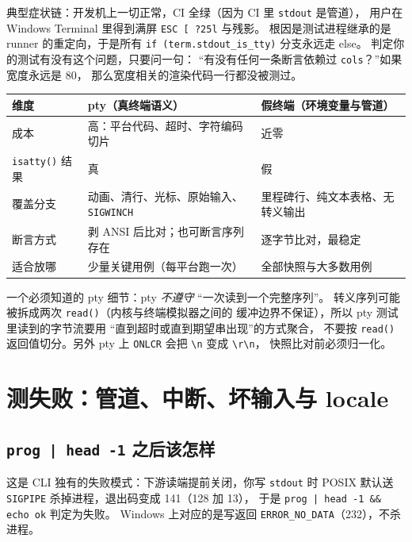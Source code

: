 \documentclass[12pt,a4paper,fontset=fandol]{ctexbook}
\newcommand{\Fn}[1]{\texttt{#1()}}
\newcommand{\Tp}[1]{\texttt{#1}}
\begin{document}
\begin{warning}[title={只覆盖管道路径是最贵的漏测}]
典型症状链：开发机上一切正常，CI 全绿（因为 CI 里 \Tp{stdout} 是管道），
用户在 Windows Terminal 里得到满屏 \Tp{ESC [ ?25l} 与残影。
根因是测试进程继承的是 runner 的重定向，于是所有
\lstinline|if (term.stdout_is_tty)| 分支永远走 else。
判定你的测试有没有这个问题，只要问一句：
``有没有任何一条断言依赖过 \Tp{cols}？''如果宽度永远是 80，
那么宽度相关的渲染代码一行都没被测过。
\end{warning}

\begin{compare}[title={pty 与假终端各自能测什么}]
\begin{tabular}{@{}>{\raggedright\arraybackslash}p{}
               >{\raggedright\arraybackslash}p{}
               >{\raggedright\arraybackslash}p{}@{}}
\toprule
维度 & pty（真终端语义） & 假终端（环境变量与管道） \\
\midrule
成本 & 高：平台代码、超时、字符编码切片 & 近零 \\
\Fn{isatty} 结果 & 真 & 假 \\
覆盖分支 & 动画、清行、光标、原始输入、\Tp{SIGWINCH} &
里程碑行、纯文本表格、无转义输出 \\
断言方式 & 剥 ANSI 后比对；也可断言序列存在 & 逐字节比对，最稳定 \\
适合放哪 & 少量关键用例（每平台跑一次） & 全部快照与大多数用例 \\
\bottomrule
\end{tabular}
\end{compare}

一个必须知道的 pty 细节：pty \emph{不遵守} ``一次读到一个完整序列''。
转义序列可能被拆成两次 \Fn{read}（内核与终端模拟器之间的
缓冲边界不保证），所以 pty 测试里读到的字节流要用
``直到超时或直到期望串出现''的方式聚合，
不要按 \Fn{read} 返回值切分。另外 pty 上 \Tp{ONLCR} 会把
\Tp{\textbackslash n} 变成 \Tp{\textbackslash r\textbackslash n}，
快照比对前必须归一化。

\section{测失败：管道、中断、坏输入与 locale}

\subsection{\Tp{prog | head -1} 之后该怎样}

这是 CLI 独有的失败模式：下游读端提前关闭，你写 \Tp{stdout} 时
POSIX 默认送 \Tp{SIGPIPE} 杀掉进程，退出码变成 141（128 加 13），
于是 \Tp{prog | head -1 \&\& echo ok} 判定为失败。
Windows 上对应的是写返回 \Tp{ERROR\_NO\_DATA}（232），不杀进程。
\end{document}
